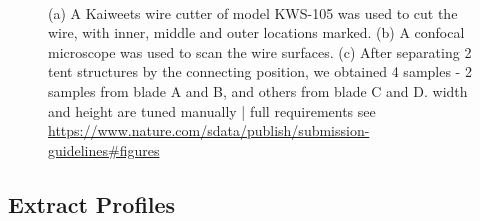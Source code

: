 \documentclass[fleqn,10pt]{wlscirep}
\newcommand{\tom}[1]{{\textcolor{RedOrange}{#1}}}
\begin{document}
\begin{figure}
\begin{minipage}{0.30\linewidth}
\end{minipage}%
%
\begin{minipage}{0.05\linewidth}
~\end{minipage}%
%
\begin{minipage}{0.65\linewidth}


\subcaption{\label{fig-T1AW-LI-R2-4edges}}

\end{minipage}%

\caption{\label{fig-cut-tent-scan}(a) A Kaiweets wire cutter of model
KWS-105 was used to cut the wire, with inner, middle and outer locations
marked. (b) A confocal microscope was used to scan the wire surfaces.
(c) After separating 2 tent structures by the connecting position, we
obtained 4 samples - 2 samples from blade A and B, and others from blade
C and D. \tom{width and height are tuned manually}
\tom{ | full requirements see \href{https://www.nature.com/sdata/publish/submission-guidelines\#figures}{https://www.nature.com/sdata/publish/submission-guidelines\#figures}}}

\end{figure}%

\subsection*{Extract Profiles}\label{sec-extract-profiles}
\end{document}
